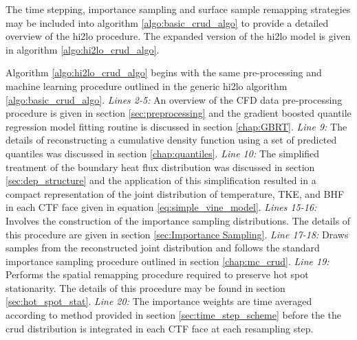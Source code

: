 The time stepping, importance sampling and surface sample remapping strategies may be included into algorithm \ref{algo:basic_crud_algo} to provide a detailed overview of the hi2lo procedure.  The expanded version of the hi2lo model is given in algorithm \ref{algo:hi2lo_crud_algo}.

Algorithm \ref{algo:hi2lo_crud_algo} begins with the same pre-processing and machine learning procedure outlined in the generic hi2lo algorithm \ref{algo:basic_crud_algo}.  \emph{Lines 2-5:} An overview of the CFD data pre-processing procedure is given in section \ref{sec:preprocessing} and the gradient boosted quantile regression model fitting routine is discussed in section \ref{chap:GBRT}.  \emph{Line 9:} The details of reconstructing a cumulative density function using a set of predicted quantiles was discussed in section \ref{chap:quantiles}.  \emph{Line 10:} The simplified treatment of the boundary heat flux distribution was discussed in section \ref{sec:dep_structure} and the application of this simplification resulted in a compact representation of the joint distribution of temperature, TKE, and BHF in each CTF face given in equation \ref{eq:simple_vine_model}.   \emph{Lines 15-16:} Involves the construction of the importance sampling distributions.  The details of this procedure are given in section \ref{sec:Importance Sampling}.   \emph{Line 17-18:} Draws samples from the reconstructed joint distribution and follows the standard importance sampling procedure outlined in section \ref{chap:mc_crud}.  \emph{Line 19:} Performs the spatial remapping procedure required to preserve hot spot stationarity.  The details of this procedure may be found in section \ref{sec:hot_spot_stat}.  \emph{Line 20:} The importance weights are time averaged according to method provided in section \ref{sec:time_step_scheme} before the the crud distribution is integrated in each CTF face at each resampling step.

